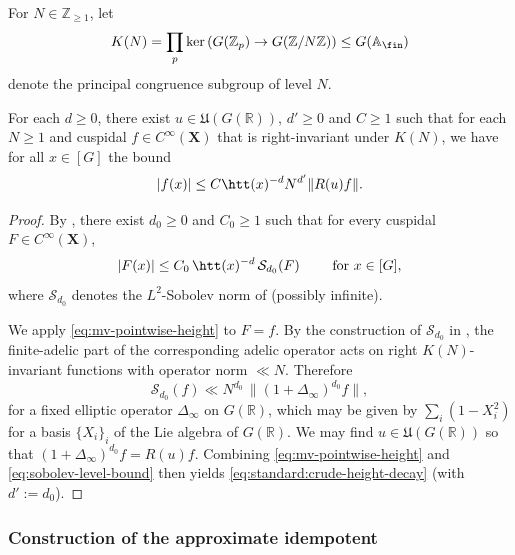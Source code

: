 For \(N\in \mathbb{Z}_{\ge 1}\), let
\begin{equation*}
  K(N) = \prod_{p} \ker \left( G(\mathbb{Z}_p) \rightarrow G(\mathbb{Z}/N\mathbb{Z}) \right) \leq  G(\mathbb{A}_{\fin})
\end{equation*}
denote the principal congruence subgroup of level \(N\).

\begin{lemma}\label{lem:standard:crude-height-decay}
  For each $d \geq 0$, there exist $u \in \mathfrak{U}(G(\mathbb{R}))$, $d' \geq 0$ and $C \geq 1$ such that for each $N \geq 1$ and cuspidal $f \in C^\infty(\mathbf{X})$ that is right-invariant under $K(N)$, we have for all $x \in [G]$ the bound
  \begin{equation}\label{eq:standard:crude-height-decay}
    |f(x)| \le C \htt(x)^{-d} N^{d'} \|R(u)f\|.
  \end{equation}
\end{lemma}
\begin{proof}
  By \cite[\S2.6.2, (2.14)]{michel-2009}, there exist $d_0 \geq 0$ and $C_0 \geq 1$ such that for every cuspidal $F \in C^\infty(\mathbf{X})$,
  \begin{equation}\label{eq:mv-pointwise-height}
    |F(x)| \le C_0\, \htt(x)^{-d}\, \mathcal{S}_{d_0}(F)
    \qquad \text{ for } x\in [G],
  \end{equation}
  where $\mathcal{S}_{d_0}$ denotes the $L^2$-Sobolev norm of \cite[\S2.3.4]{michel-2009} (possibly infinite).

  We apply \eqref{eq:mv-pointwise-height} to $F=f$.  By the construction of $\mathcal{S}_{d_0}$ in \cite[\S2.3.3--\S2.3.4]{michel-2009}, the finite-adelic part of the corresponding adelic operator acts on right $K(N)$-invariant functions with operator norm $\ll N$.  Therefore
  \begin{equation}\label{eq:sobolev-level-bound}
    \mathcal{S}_{d_0}(f) \ll N^{d_0}\,\|(1+\Delta_\infty)^{d_0} f\|,
  \end{equation}
  for a fixed elliptic operator $\Delta_\infty$ on $G(\mathbb{R})$, which may be given by $\sum_i (1 - X_i^2)$ for a basis $\{X_i\}_i$ of the Lie algebra of $G(\mathbb{R})$.  We may find $u\in \mathfrak{U}(G(\mathbb{R}))$ so that $(1+\Delta_\infty)^{d_0} f = R(u)f$.  Combining \eqref{eq:mv-pointwise-height} and \eqref{eq:sobolev-level-bound} then yields \eqref{eq:standard:crude-height-decay} (with $d' := d_0$).
\end{proof}

\subsubsection{Construction of the approximate idempotent}\label{sec:cuhjo7z3jd}

